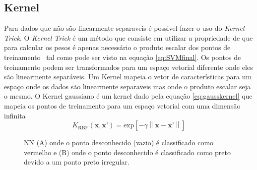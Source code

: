 \subsection{Kernel}
Para dados que n\~ao s\~ao linearmente separaveis \'e possivel fazer o uso do \textit{Kernel Trick}.
O \textit{Kernel Trick} \'e um m\'etodo que consiste em utilizar a propriedade de que para calcular os pesos \'e apenas necessário o produto escalar dos pontos de treinamento \ tal como pode ser visto na equa\c{c}\~ao \ref{eq:SVMfinal}.
Os pontos de treinamento podem ser transformados para um espa\c{c}o vetorial diferente onde eles s\~ao linearmente separáveis.
Um Kernel mapeia o vetor de características para um espa\c{c}o onde os dados s\~ao linearmente separaveis mas onde o produto escalar seja o mesmo.
O Kernel gaussiano \'e um kernel dado pela equa\c{c}\~ao \ref{eq:gausskernel} que mapeia os pontos de treinamento para um espa\c{c}o vetorial com uma dimens\~ao infinita 
\begin{equation}\label{eq:gausskernel}
K_{\text{RBF}}\left( \textbf{x},\textbf{x'} \right) = \text{exp} \left[ -\gamma \left\|  \textbf{x} - \textbf{x'} \right\| \right]  	
\end{equation}
%
%
\begin{figure}[!htp]
	\begin{center}
		\caption{NN (A) onde o ponto desconhecido (vazio) \'e classificado como vermelho e (B) onde o ponto desconhecido \'e classificado como preto devido a um ponto preto irregular.}
		
		
		\label{fig:kNN}
	\end{center}	
\end{figure}

